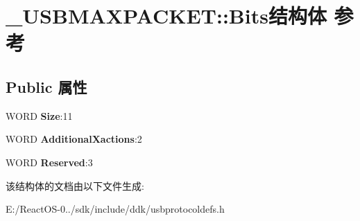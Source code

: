 \hypertarget{struct___u_s_b_m_a_x_p_a_c_k_e_t_1_1_bits}{}\section{\+\_\+\+U\+S\+B\+M\+A\+X\+P\+A\+C\+K\+ET\+:\+:Bits结构体 参考}
\label{struct___u_s_b_m_a_x_p_a_c_k_e_t_1_1_bits}
\subsection*{Public 属性}
\begin{DoxyCompactItemize}
\item 
\mbox{\label{struct___u_s_b_m_a_x_p_a_c_k_e_t_1_1_bits_a2a121efc8a5805d3533ee02c8829fedc}} 
W\+O\+RD {\bfseries Size}\+:11
\item 
\mbox{\label{struct___u_s_b_m_a_x_p_a_c_k_e_t_1_1_bits_a483710a5dac5aa7a35b21991402addb4}} 
W\+O\+RD {\bfseries Additional\+Xactions}\+:2
\item 
\mbox{\label{struct___u_s_b_m_a_x_p_a_c_k_e_t_1_1_bits_adc80df2d90af320ae6d439d0e778b6e2}} 
W\+O\+RD {\bfseries Reserved}\+:3
\end{DoxyCompactItemize}


该结构体的文档由以下文件生成\+:\begin{DoxyCompactItemize}
\item 
E\+:/\+React\+O\+S-\/0../sdk/include/ddk/usbprotocoldefs.\+h\end{DoxyCompactItemize}
